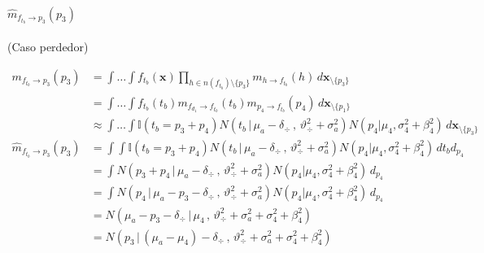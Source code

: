 \documentclass[11pt,twoside,spanish]{report} %
\begin{document}
\paragraph{$\widehat{m}_{f_{t_b} \rightarrow p_3}(p_3)$} (Caso perdedor)

\begin{equation}
	\begin{split}
		m_{f_{t_b} \rightarrow p_3}(p_3) &= \int \dots \int f_{t_b}(\textbf{x}) \prod_{h \in n(f_{t_b}) \setminus \{p_3\} } m_{h \rightarrow f_{t_b}}(h) \, d\textbf{x}_{\setminus \{p_3\} }  \\
		&= \int \dots \int f_{t_b}(t_b)  m_{f_{d_1} \rightarrow f_{t_b}}(t_b) m_{p_4 \rightarrow f_{t_b}}(p_4)\, d\textbf{x}_{\setminus \{p_1\} }  \\
		&\approx  \int \dots \int \mathbb{I}(t_b = p_3 + p_4) N(t_b \, | \, \mu_a - \delta_{\div} \, , \, \vartheta_{\div}^2 + \sigma_a^2) N(p_4 | \mu_4 , \sigma_4^2 + \beta_4^2)  \, d\textbf{x}_{\setminus \{p_3\} } \\[0.1cm]
		\widehat{m}_{f_{t_b} \rightarrow p_3}(p_3)  & =\int \int \mathbb{I}(t_b = p_3 + p_4) N(t_b \, | \, \mu_a - \delta_{\div} \, , \, \vartheta_{\div}^2 + \sigma_a^2) N(p_4 | \mu_4 , \sigma_4^2 + \beta_4^2)  \, d{t_b} d_{p_4} \\
		& =\int N(p_3 + p_4 \, | \, \mu_a - \delta_{\div} \, , \, \vartheta_{\div}^2 + \sigma_a^2) N(p_4 | \mu_4 , \sigma_4^2+ \beta_4^2 )   \, d_{p_4} \\
		& =\int N(p_4 \, | \, \mu_a - p_3 - \delta_{\div} \, , \, \vartheta_{\div}^2 + \sigma_a^2) N(p_4 | \mu_4 , \sigma_4^2 + \beta_4^2)   \, d_{p_4} \\
		& = N(\mu_a - p_3 - \delta_{\div} \,|\, \mu_4 \,,\,\vartheta_{\div}^2 + \sigma_a^2 + \sigma_4^2 + \beta_4^2)   \\
		&=  N( p_3 \,|\,  (\mu_a - \mu_4) - \delta_{\div}  \,,\,\vartheta_{\div}^2 + \sigma_a^2 + \sigma_4^2 + \beta_4^2)  \\
	\end{split}
\end{equation}
\end{document}
